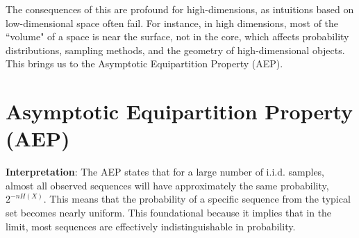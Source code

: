 The consequences of this are profound for high-dimensions, as intuitions based on low-dimensional space often fail. For instance, in high dimensions, most of the ``volume" of a space is near the surface, not in the core, which affects probability distributions, sampling methods, and the geometry of high-dimensional objects. This brings us to the Asymptotic Equipartition Property (AEP).


\section{Asymptotic Equipartition Property (AEP)}


\textbf{Interpretation}: The AEP states that for a large number of i.i.d. samples, almost all observed sequences will have approximately the same probability, $2^{-nH(X)}$. This means that the probability of a specific sequence from the typical set becomes nearly uniform. This foundational because it implies that in the limit, most sequences are effectively indistinguishable in probability.

